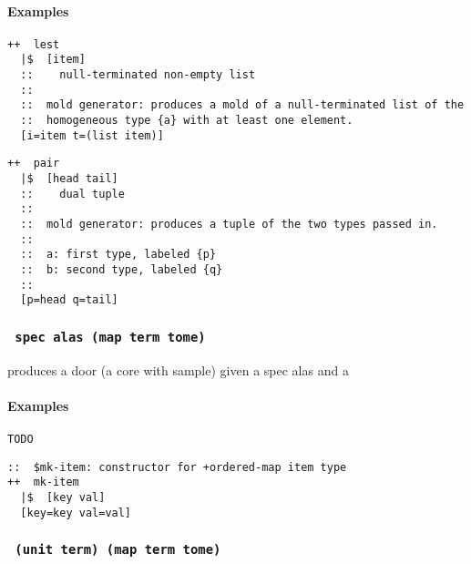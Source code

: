 \paragraph{Examples}

\begin{lstlisting}[caption={\texttt{++lest} (non-empty list) from \texttt{hoon.hoon}},
                   style=nonumbers]
++  lest
  |$  [item]
  ::    null-terminated non-empty list
  ::
  ::  mold generator: produces a mold of a null-terminated list of the
  ::  homogeneous type {a} with at least one element.
  [i=item t=(list item)]
\end{lstlisting}

\begin{lstlisting}[caption={\texttt{++pair} from \texttt{hoon.hoon}},
                   style=nonumbers]
++  pair
  |$  [head tail]
  ::    dual tuple
  ::
  ::  mold generator: produces a tuple of the two types passed in.
  ::
  ::  a: first type, labeled {p}
  ::  b: second type, labeled {q}
  ::
  [p=head q=tail]
\end{lstlisting}


\subsubsection{{\barcab\texttt{~spec alas (map term tome)}}} %
\label{ap:barcab}

\pbarcab produces a door (a core with sample) given a spec alas and a

\paragraph{Examples}

\begin{lstlisting}[style=nonumbers]
TODO
\end{lstlisting}

\begin{lstlisting}[caption={\texttt{+\$mk-item} from \texttt{hoon.hoon}},
                   style=nonumbers]
::  $mk-item: constructor for +ordered-map item type
++  mk-item
  |$  [key val]
  [key=key val=val]
\end{lstlisting}


\subsubsection{\textbf{\barcen\texttt{~(unit term) (map term tome)}}}
\label{ap:barcen}

